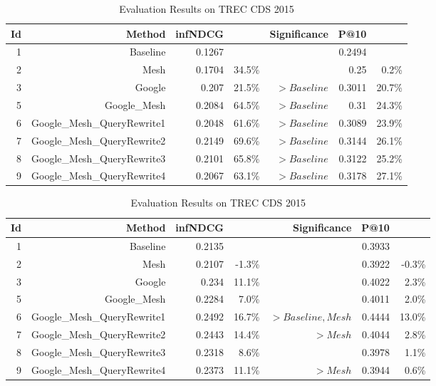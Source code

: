 \documentclass{IEEEtran}
\begin{document}
\begin{table*}[htbp]
  \centering
  \renewcommand\arraystretch{1.2}
  \caption{Evaluation Results on TREC CDS 2015}
    \begin{tabular}{rrrrrrr}
    \toprule
    Id    & Method & infNDCG &       & Significance & P@10  &  \\
    \midrule
    1     & Baseline & 0.1267 &       &       & 0.2494 &  \\
    2     & Mesh  & 0.1704 & 34.5\% &       & 0.25  & 0.2\% \\
    3     & Google & 0.207 & 21.5\% & $>Baseline$ & 0.3011 & 20.7\% \\
    5     & Google\_Mesh & 0.2084 & 64.5\% & $>Baseline$ & 0.31  & 24.3\% \\
    6     & Google\_Mesh\_QueryRewrite1 & 0.2048 & 61.6\% & $>Baseline$ & 0.3089 & 23.9\% \\
    7     & Google\_Mesh\_QueryRewrite2 & 0.2149 & 69.6\% & $>Baseline$ & 0.3144 & 26.1\% \\
    8     & Google\_Mesh\_QueryRewrite3 & 0.2101 & 65.8\% & $>Baseline$ & 0.3122 & 25.2\% \\
    9     & Google\_Mesh\_QueryRewrite4 & 0.2067 & 63.1\% & $>Baseline$ & 0.3178 & 27.1\% \\
    \bottomrule
    \end{tabular}%
  \label{tab:addlabel}%
\end{table*}%

\begin{table*}[htbp]
  \centering
  \renewcommand\arraystretch{1.2}
  \caption{Evaluation Results on TREC CDS 2015}
    \begin{tabular}{rrrrrrr}
    \toprule
    Id    & Method & infNDCG &       & Significance & P@10  &  \\
    \midrule
    1     & Baseline & 0.2135 &       &       & 0.3933 &  \\
    2     & Mesh  & 0.2107 & -1.3\% &       & 0.3922 & -0.3\% \\
    3     & Google & 0.234 & 11.1\% &       & 0.4022 & 2.3\% \\
    5     & Google\_Mesh & 0.2284 & 7.0\% &       & 0.4011 & 2.0\% \\
    6     & Google\_Mesh\_QueryRewrite1 & 0.2492 & 16.7\% & $>{Baseline, Mesh}$ & 0.4444 & 13.0\% \\
    7     & Google\_Mesh\_QueryRewrite2 & 0.2443 & 14.4\% & $>Mesh$ & 0.4044 & 2.8\% \\
    8     & Google\_Mesh\_QueryRewrite3 & 0.2318 & 8.6\% &       & 0.3978 & 1.1\% \\
    9     & Google\_Mesh\_QueryRewrite4 & 0.2373 & 11.1\% & $>Mesh$ & 0.3944 & 0.6\% \\
    \bottomrule
    \end{tabular}%
  \label{tab:addlabel}%
\end{table*}%
\end{document}
